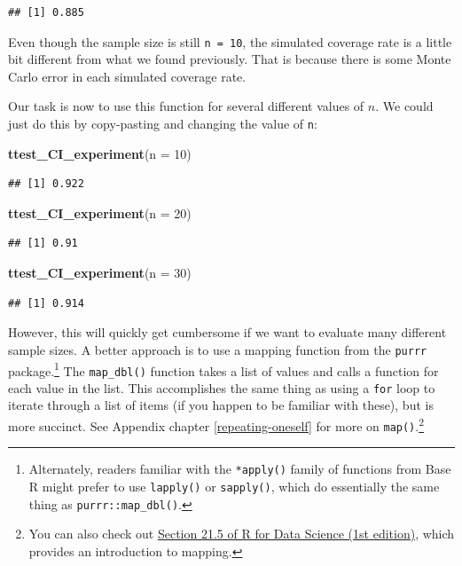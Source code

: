 \documentclass[
]{book}
\newenvironment{Shaded}{\begin{snugshade}}{\end{snugshade}}
\newcommand{\AttributeTok}[1]{\textcolor[rgb]{0.13,0.29,0.53}{#1}}
\newcommand{\DecValTok}[1]{\textcolor[rgb]{0.00,0.00,0.81}{#1}}
\newcommand{\FunctionTok}[1]{\textcolor[rgb]{0.13,0.29,0.53}{\textbf{#1}}}
\newcommand{\NormalTok}[1]{#1}
\begin{document}
\begin{verbatim}
## [1] 0.885
\end{verbatim}

Even though the sample size is still \texttt{n\ =\ 10}, the simulated coverage rate is a little bit different from what we found previously.
That is because there is some Monte Carlo error in each simulated coverage rate.

Our task is now to use this function for several different values of \(n\). We could just do this by copy-pasting and changing the value of \texttt{n}:

\begin{Shaded}
\begin{Highlighting}[]
\FunctionTok{ttest\_CI\_experiment}\NormalTok{(}\AttributeTok{n =} \DecValTok{10}\NormalTok{)}
\end{Highlighting}
\end{Shaded}

\begin{verbatim}
## [1] 0.922
\end{verbatim}

\begin{Shaded}
\begin{Highlighting}[]
\FunctionTok{ttest\_CI\_experiment}\NormalTok{(}\AttributeTok{n =} \DecValTok{20}\NormalTok{)}
\end{Highlighting}
\end{Shaded}

\begin{verbatim}
## [1] 0.91
\end{verbatim}

\begin{Shaded}
\begin{Highlighting}[]
\FunctionTok{ttest\_CI\_experiment}\NormalTok{(}\AttributeTok{n =} \DecValTok{30}\NormalTok{)}
\end{Highlighting}
\end{Shaded}

\begin{verbatim}
## [1] 0.914
\end{verbatim}

However, this will quickly get cumbersome if we want to evaluate many different sample sizes.
A better approach is to use a mapping function from the \texttt{purrr} package.\footnote{Alternately, readers familiar with the \texttt{*apply()} family of functions from Base R might prefer to use \texttt{lapply()} or \texttt{sapply()}, which do essentially the same thing as \texttt{purrr::map\_dbl()}.}
The \texttt{map\_dbl()} function takes a list of values and calls a function for each value in the list.
This accomplishes the same thing as using a \texttt{for} loop to iterate through a list of items (if you happen to be familiar with these), but is more succinct.
See Appendix chapter \ref{repeating-oneself} for more on \texttt{map()}.\footnote{You can also check out \href{https://r4ds.had.co.nz/iteration.html\#the-map-functions}{Section 21.5 of R for Data Science (1st edition)}, which provides an introduction to mapping.}
\end{document}
